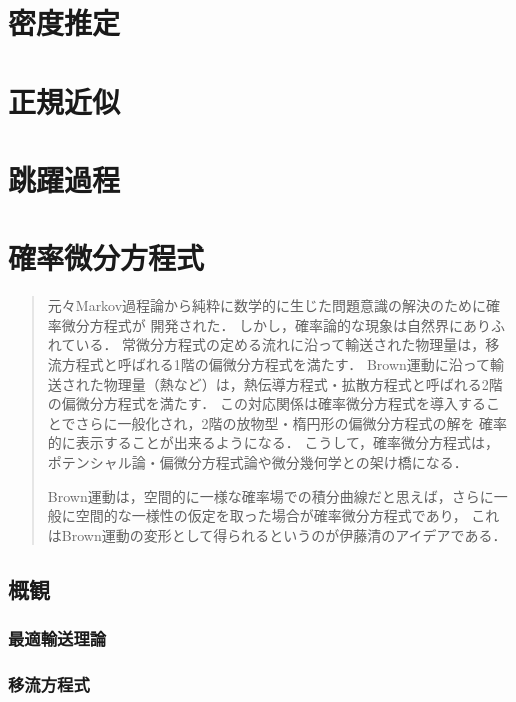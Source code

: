 \documentclass[uplatex,dvipdfmx]{jsreport}
\begin{document}
\chapter{密度推定}

\chapter{正規近似}

\chapter{跳躍過程}

\chapter{確率微分方程式}

\begin{quotation}
    元々Markov過程論から純粋に数学的に生じた問題意識の解決のために確率微分方程式が
    開発された．
    しかし，確率論的な現象は自然界にありふれている．
    常微分方程式の定める流れに沿って輸送された物理量は，移流方程式と呼ばれる1階の偏微分方程式を満たす．
    Brown運動に沿って輸送された物理量（熱など）は，熱伝導方程式・拡散方程式と呼ばれる2階の偏微分方程式を満たす．
    この対応関係は確率微分方程式を導入することでさらに一般化され，2階の放物型・楕円形の偏微分方程式の解を
    確率的に表示することが出来るようになる．
    こうして，確率微分方程式は，ポテンシャル論・偏微分方程式論や微分幾何学との架け橋になる．

    Brown運動は，空間的に一様な確率場での積分曲線だと思えば，さらに一般に空間的な一様性の仮定を取った場合が確率微分方程式であり，
    これはBrown運動の変形として得られるというのが伊藤清のアイデアである．
\end{quotation}

\section{概観}

\subsection{最適輸送理論}

\begin{definition}
    
\end{definition}

\subsection{移流方程式}
\end{document}
